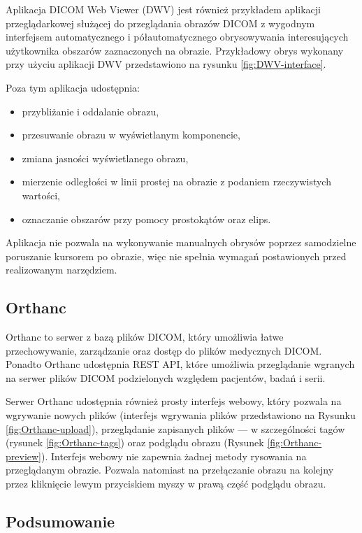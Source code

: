 \documentclass[a4paper,11pt,twoside,openright]{report}
\theoremstyle{definition}
\begin{document}
Aplikacja DICOM Web Viewer (DWV) \cite{DWV} jest również przykładem aplikacji przeglądarkowej służącej do przeglądania obrazów DICOM z wygodnym interfejsem automatycznego i półautomatycznego obrysowywania interesujących użytkownika obszarów zaznaczonych na obrazie. Przykładowy obrys wykonany przy użyciu aplikacji DWV przedstawiono na rysunku \ref{fig:DWV-interface}.

 Poza tym aplikacja udostępnia:
\begin{itemize}[noitemsep]
\item przybliżanie i oddalanie obrazu,
\item przesuwanie obrazu w wyświetlanym komponencie,
\item zmiana jasności wyświetlanego obrazu,
\item mierzenie odległości w linii prostej na obrazie z podaniem rzeczywistych wartości,
\item oznaczanie obszarów przy pomocy prostokątów oraz elips.
\end{itemize}

Aplikacja nie pozwala na wykonywanie manualnych obrysów poprzez samodzielne poruszanie kursorem po obrazie, więc nie spełnia wymagań postawionych przed realizowanym narzędziem.

\subsection {Orthanc}

Orthanc to serwer z bazą plików DICOM, który umożliwia łatwe przechowywanie, zarządzanie oraz dostęp do plików medycznych DICOM. Ponadto Orthanc udostępnia REST API, które umożliwia przeglądanie wgranych na serwer plików DICOM podzielonych względem pacjentów, badań i serii.

Serwer Orthanc udostępnia również prosty interfejs webowy, który pozwala na wgrywanie nowych plików (interfejs wgrywania plików przedstawiono na Rysunku \ref{fig:Orthanc-upload}), przeglądanie zapisanych plików --- w szczególności tagów (rysunek \ref{fig:Orthanc-tags}) oraz podglądu obrazu (Rysunek \ref{fig:Orthanc-preview}). Interfejs webowy nie zapewnia żadnej metody rysowania na przeglądanym obrazie. Pozwala natomiast na przełączanie obrazu na kolejny przez kliknięcie lewym przyciskiem myszy w prawą część podglądu obrazu.

\subsection {Podsumowanie}
\end{document}
